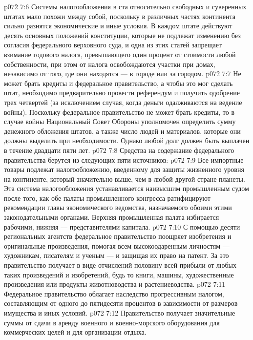 \vs p072 7:6 \pc Системы налогообложения в ста относительно свободных и суверенных штатах мало похожи между собой, поскольку в различных частях континента сильно разнятся экономические и иные условия. В каждом штате действуют десять основных положений конституции, которые не подлежат изменению без согласия федерального верховного суда, и одна из этих статей запрещает взимание годового налога, превышающего один процент от стоимости любой собственности, при этом от налога освобождаются участки при домах, независимо от того, где они находятся --- в городе или за городом.
\vs p072 7:7 Не может брать кредиты и федеральное правительство, а чтобы это мог сделать штат, необходимо предварительно провести референдум и получить одобрение трех четвертей (за исключением случая, когда деньги одалживаются на ведение войны). Поскольку федеральное правительство не может брать кредиты, то в случае войны Национальный Совет Обороны уполномочен определить сумму денежного обложения штатов, а также число людей и материалов, которые они должны выделить при необходимости. Однако любой долг должен быть выплачен в течение двадцати пяти лет.
\vs p072 7:8 \pc Средства на содержание федерального правительства берутся из следующих пяти источников:
\vs p072 7:9 \bibnobreakspace {} Все импортные товары подлежат налогообложению, введенному для защиты жизненного уровня на континенте, который значительно выше, чем в любой другой стране планеты. Эта система налогообложения устанавливается наивысшим промышленным судом после того, как обе палаты промышленного конгресса ратифицируют рекомендации главы экономического ведомства, назначаемого обоими этими законодательными органами. Верхняя промышленная палата избирается рабочими, нижняя --- представителями капитала.
\vs p072 7:10 \pc {}\bibnobreakspace {} С помощью десяти региональных агентств федеральное правительство поощряет изобретения и оригинальные произведения, помогая всем высокоодаренным личностям --- художникам, писателям и ученым --- и защищая их право на патент. За это правительство получает в виде отчислений половину всей прибыли от любых таких произведений и изобретений, будь то книги, машины, художественные произведения или продукты животноводства и растениеводства.
\vs p072 7:11 \pc {}\bibnobreakspace {} Федеральное правительство облагает наследство прогрессивным налогом, составляющим от одного до пятидесяти процентов в зависимости от размеров имущества и иных условий.
\vs p072 7:12 \pc {}\bibnobreakspace {} Правительство получает значительные суммы от сдачи в аренду военного и военно\hyp{}морского оборудования для коммерческих целей и для организации отдыха.
